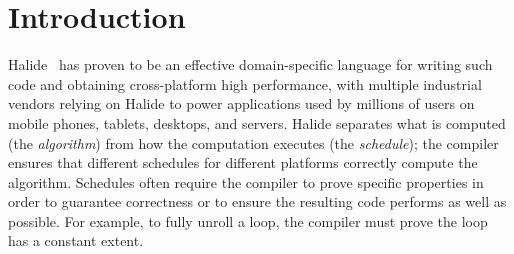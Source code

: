 \documentclass[acmsmall,review,anonymous]{acmart}\settopmatter{printfolios=true,printccs=false,printacmref=false}
\begin{document}




\maketitle


\section{Introduction}
%

Halide~\cite{ragankelley2012halide, ragankelley2013halide} has proven to be an effective
domain-specific language for writing such code and obtaining cross-platform
high performance, with multiple industrial vendors relying on Halide to power
applications used by millions of users on mobile phones, tablets, desktops, and
servers.  Halide separates what is computed (the \textit{algorithm}) from how
the computation executes (the \textit{schedule}); the compiler ensures that
different schedules for different platforms correctly compute the algorithm.
Schedules often require the compiler to prove specific properties in order
to guarantee correctness or to ensure the resulting code performs as well
as possible.  For example, to fully unroll a loop, the compiler must prove
the loop has a constant extent.
\end{document}
